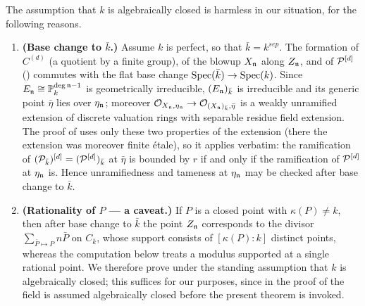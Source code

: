 \begin{rem*}
    The assumption that $k$ is algebraically closed is harmless in our situation, for the following reasons.
    \begin{enumerate}
        \item \textbf{(Base change to $\bar{k}$.)} Assume $k$ is perfect, so that $\bar{k}=k^{sep}$.
        The formation of $C^{(d)}$ (a quotient by a finite group), of the blowup $X_{\mathfrak{n}}$ along $Z_{\mathfrak{n}}$, and of
        $\mathcal{P}^{[d]}$ () commutes with the flat base change $\operatorname{Spec}(\bar{k}) \to \operatorname{Spec}(k)$.
        Since $E_{\mathfrak{n}} \cong \mathbb{P}^{\deg \mathfrak{n} - 1}_k$ is geometrically irreducible, $(E_{\mathfrak{n}})_{\bar{k}}$ is irreducible
        and its generic point $\bar{\eta}$ lies over $\eta_{\mathfrak{n}}$; moreover
        $\mathcal{O}_{X_{\mathfrak{n}}, \eta_{\mathfrak{n}}} \to \mathcal{O}_{(X_{\mathfrak{n}})_{\bar{k}}, \bar{\eta}}$ is a weakly unramified extension of discrete
        valuation rings with separable residue field extension. The proof of 
        uses only these two properties of the extension (there the extension was moreover finite étale), so it applies
        verbatim: the ramification of $(\mathcal{P}_{\bar{k}})^{[d]} = (\mathcal{P}^{[d]})_{\bar{k}}$ at $\bar{\eta}$ is bounded by $r$ if
        and only if the ramification of $\mathcal{P}^{[d]}$ at $\eta_{\mathfrak{n}}$ is. Hence unramifiedness and tameness at $\eta_{\mathfrak{n}}$
        may be checked after base change to $\bar{k}$.
        \item \textbf{(Rationality of $P$ --- a caveat.)} If $P$ is a closed point with $\kappa(P) \neq k$, then after base
        change to $\bar{k}$ the point $Z_{\mathfrak{n}}$ corresponds to the divisor $\sum_{\bar{P} \mapsto P} n \bar{P}$ on
        $C_{\bar{k}}$, whose support consists of $[\kappa(P):k]$ distinct points, whereas the computation below treats a
        modulus supported at a single rational point. We therefore prove  under
        the standing assumption that $k$ is algebraically closed; this suffices for our purposes, since in the proof of
         the field is assumed algebraically closed before the present
        theorem is invoked.
    \end{enumerate}
\end{rem*}

